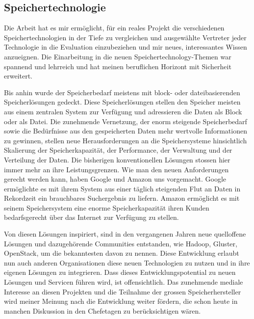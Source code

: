 \subsection{Speichertechnologie}
Die Arbeit hat es mir ermöglicht, für ein reales Projekt die verschiedenen Speichertechnologien in der Tiefe zu vergleichen und ausgewählte Vertreter jeder Technologie in die Evaluation einzubeziehen und mir neues, interessantes Wissen anzueignen. Die Einarbeitung in die neuen Speichertechnology-Themen war spannend und lehrreich und hat meinen beruflichen Horizont mit Sicherheit erweitert.

Bis anhin wurde der Speicherbedarf meistens mit block- oder dateibasierenden Speicherlösungen gedeckt. Diese Speicherlösungen stellen den Speicher meisten aus einem zentralen System zur Verfügung und adressieren die Daten als Block oder als Datei.
Die zunehmende Vernetzung, der enorm steigende Speicherbedarf sowie die Bedürfnisse aus den gespeicherten Daten mehr wertvolle Informationen zu gewinnen, stellen neue Herausforderungen an die Speichersysteme hinsichtlich Skalierung der Speicherkapazität, der Performance, der Verwaltung und der Verteilung der Daten. Die bisherigen konventionellen Lösungen stossen hier immer mehr an ihre Leistungsgrenzen. Wie man den neuen Anforderungen gerecht werden kann, haben Google und Amazon uns vorgemacht. Google ermöglichte es mit ihrem System aus einer täglich steigenden Flut an Daten in Rekordzeit ein brauchbares Suchergebnis zu liefern. Amazon ermöglicht es mit seinem Speichersystem eine enorme Speicherkapazität ihren Kunden bedarfsgerecht über das Internet zur Verfügung zu stellen. 

Von diesen Lösungen inspiriert, sind in den vergangenen Jahren neue quelloffene Lösungen und dazugehörende Communities entstanden, wie Hadoop, Gluster, OpenStack, um die bekanntesten davon zu nennen. Diese Entwicklung erlaubt nun auch anderen Organisationen diese neuen Technologien zu nutzen und in ihre eigenen Lösungen zu integrieren. Dass dieses Entwicklungspotential zu neuen Lösungen und Servicen führen wird, ist offensichtlich. Das zunehmende mediale Interesse an diesen Projekten und die Teilnahme der grossen Speicherhersteller wird meiner Meinung nach die Entwicklung weiter fördern, die schon heute in manchen Diskussion in den Chefetagen zu berücksichtigen wären. 

